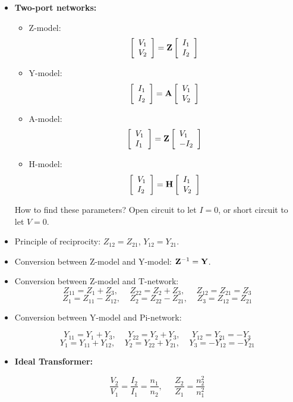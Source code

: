 \begin{itemize}
\item {\bf Two-port networks:}
\begin{itemize}
\item Z-model:
\[ \left[ \begin{array}{l} V_1 \\ V_2\end{array} \right]
	={\bf Z}\left[ \begin{array}{l} I_1 \\ I_2\end{array} \right] \]
\item Y-model:
\[ \left[ \begin{array}{l} I_1 \\ I_2\end{array} \right]
	={\bf A}\left[ \begin{array}{l} V_1 \\ V_2\end{array} \right] \]
\item A-model:
\[ \left[ \begin{array}{l} V_1 \\ I_1\end{array} \right]
	={\bf Z}\left[ \begin{array}{l} V_1 \\ -I_2\end{array} \right] \]
\item H-model:
\[ \left[ \begin{array}{l} V_1 \\ I_2\end{array} \right]
	={\bf H}\left[ \begin{array}{l} I_1 \\ V_2\end{array} \right] \]
\end{itemize}
How to find these parameters? Open circuit to let $I=0$, or short circuit to
let $V=0$.
\item Principle of reciprocity: $Z_{12}=Z_{21}$, $Y_{12}=Y_{21}$.

\item Conversion between Z-model and Y-model: ${\bf Z}^{-1}={\bf Y}$.

\item Conversion between Z-model and T-network:
\[ Z_{11}=Z_1+Z_3,\;\;\;\;\;Z_{22}=Z_2+Z_3,\;\;\;\;\;Z_{12}=Z_{21}=Z_3	\]
\[ Z_1=Z_{11}-Z_{12},\;\;\;\;Z_2=Z_{22}-Z_{21},\;\;\;\;Z_3=Z_{12}=Z_{21} \]

\item Conversion between Y-model and Pi-network:

\[ Y_{11}=Y_1+Y_3,\;\;\;\;\;Y_{22}=Y_2+Y_3,\;\;\;\;\;Y_{12}=Y_{21}=-Y_3	\]
\[ Y_1=Y_{11}+Y_{12},\;\;\;\;Y_2=Y_{22}+Y_{21},\;\;\;\;Y_3=-Y_{12}=-Y_{21} \]

\item {\bf Ideal Transformer:}

\[	\frac{V_2}{V_1}=\frac{I_2}{I_1}=\frac{n_1}{n_2},\;\;\;\;\;
	\frac{Z_2}{Z_1}=\frac{n^2_2}{n^2_1}	\]
\end{itemize}

